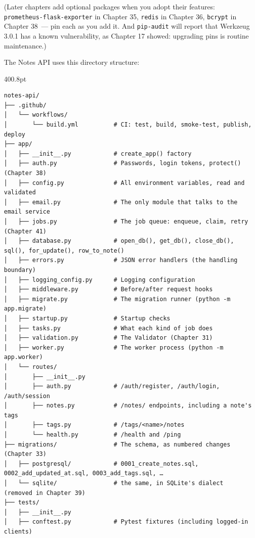 \noindent{}(Later chapters add optional packages when you adopt their features: \texttt{prometheus-}\allowbreak{}\texttt{flask-}\allowbreak{}\texttt{exporter} in Chapter 35, \texttt{redis} in Chapter 36, \texttt{bcrypt} in Chapter 38~--- pin each as you add it. And \texttt{pip-audit} will report that Werkzeug 3.0.1 has a known vulnerability, as Chapter 17 showed: upgrading pins is routine maintenance.)

\label{44-appendices:a4-the-project-structure}

The Notes API uses this directory structure:

\begin{diagrambox}{400.8pt}
\begin{Verbatim}[fontsize=\fontsize{7.5}{7.12}\selectfont]
notes-api/
├── .github/
│   └── workflows/
│       └── build.yml          # CI: test, build, smoke-test, publish, deploy
├── app/
│   ├── __init__.py            # create_app() factory
│   ├── auth.py                # Passwords, login tokens, protect() (Chapter 38)
│   ├── config.py              # All environment variables, read and validated
│   ├── email.py               # The only module that talks to the email service
│   ├── jobs.py                # The job queue: enqueue, claim, retry (Chapter 41)
│   ├── database.py            # open_db(), get_db(), close_db(), sql(), for_update(), row_to_note()
│   ├── errors.py              # JSON error handlers (the handling boundary)
│   ├── logging_config.py      # Logging configuration
│   ├── middleware.py          # Before/after request hooks
│   ├── migrate.py             # The migration runner (python -m app.migrate)
│   ├── startup.py             # Startup checks
│   ├── tasks.py               # What each kind of job does
│   ├── validation.py          # The Validator (Chapter 31)
│   ├── worker.py              # The worker process (python -m app.worker)
│   └── routes/
│       ├── __init__.py
│       ├── auth.py            # /auth/register, /auth/login, /auth/session
│       ├── notes.py           # /notes/ endpoints, including a note's tags
│       ├── tags.py            # /tags/<name>/notes
│       └── health.py          # /health and /ping
├── migrations/                # The schema, as numbered changes (Chapter 33)
│   ├── postgresql/            # 0001_create_notes.sql, 0002_add_updated_at.sql, 0003_add_tags.sql, …
│   └── sqlite/                # the same, in SQLite's dialect (removed in Chapter 39)
├── tests/
│   ├── __init__.py
│   ├── conftest.py            # Pytest fixtures (including logged-in clients)

\end{Verbatim}
\end{diagrambox}
